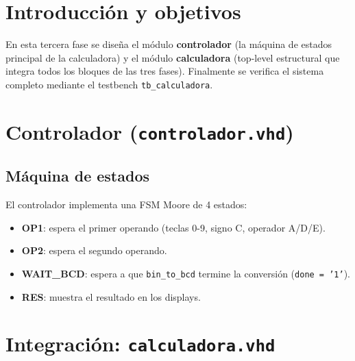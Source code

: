 \documentclass[memoria_final]{subfiles}
\begin{document}
  \newpage
  \tableofcontents
  \newpage
\fi%
{}

\section{Introducción y objetivos}

En esta tercera fase se diseña el módulo \textbf{controlador} (la máquina de
estados principal de la calculadora) y el módulo \textbf{calculadora} (top-level
estructural que integra todos los bloques de las tres fases). Finalmente se
verifica el sistema completo mediante el testbench \texttt{tb\_calculadora}.

\section{Controlador (\texttt{controlador.vhd})}

\subsection{Máquina de estados}

El controlador implementa una FSM Moore de 4 estados:
\begin{itemize}
  \item \textbf{OP1}: espera el primer operando (teclas 0-9, signo C,
    operador A/D/E).
  \item \textbf{OP2}: espera el segundo operando.
  \item \textbf{WAIT\_BCD}: espera a que \texttt{bin\_to\_bcd} termine la
    conversión (\texttt{done = '1'}).
  \item \textbf{RES}: muestra el resultado en los displays.
\end{itemize}

\section{Integración: \texttt{calculadora.vhd}}
\end{document}
